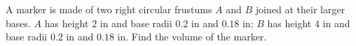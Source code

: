 A marker is made of two right circular frustums $A$ and $B$ joined at their larger bases. $A$ has height $2$ in and base radii $0.2$ in and $0.18$ in; $B$ has height $4$ in and base radii $0.2$ in and $0.18$ in. Find the volume of the marker.
